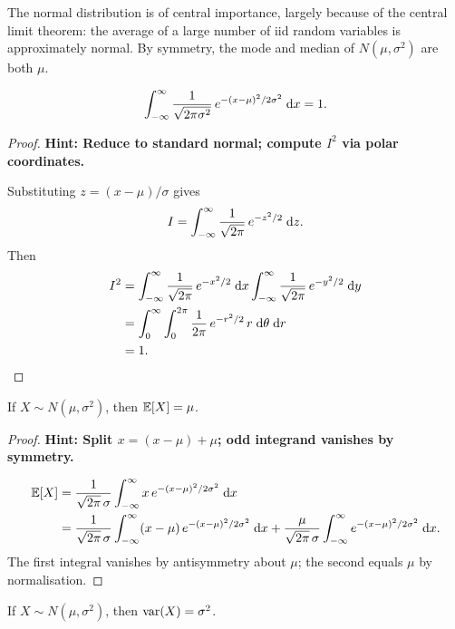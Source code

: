 \documentclass[a4paper]{article}
\begin{document}
\begin{remark}
  The normal distribution is of central importance, largely because of the central limit theorem: the average of a large number of iid random variables is approximately normal.
  By symmetry, the mode and median of $N(\mu, \sigma^2)$ are both $\mu$.
\end{remark}

\begin{prop}
  \[
    \int_{-\infty}^\infty \frac{1}{\sqrt{2\pi\sigma^2}}\, e^{-(x - \mu)^2 / 2\sigma^2}\;\mathrm{d} x = 1.
  \]
\end{prop}

\begin{proof}
  \textbf{Hint: Reduce to standard normal; compute $I^2$ via polar coordinates.}

  Substituting $z = (x - \mu)/\sigma$ gives
  \[
    I = \int_{-\infty}^\infty \frac{1}{\sqrt{2\pi}}\,e^{-z^2/2}\;\mathrm{d} z.
  \]
  Then
  \begin{align*}
    I^2 &= \int_{-\infty}^\infty \frac{1}{\sqrt{2\pi}}\, e^{-x^2/2}\;\mathrm{d} x \int_{-\infty}^\infty \frac{1}{\sqrt{2\pi}}\, e^{-y^2/2}\;\mathrm{d} y\\
    &= \int_0^\infty \int_0^{2\pi} \frac{1}{2\pi}\,e^{-r^2/2}\,r\;\mathrm{d}\theta\;\mathrm{d} r\\
    &= 1.\qedhere
  \end{align*}
\end{proof}

\begin{prop}
  If $X \sim N(\mu, \sigma^2)$, then $\mathbb{E}[X] = \mu$.
\end{prop}

\begin{proof}
  \textbf{Hint: Split $x = (x - \mu) + \mu$; odd integrand vanishes by symmetry.}

  \begin{align*}
    \mathbb{E}[X] &= \frac{1}{\sqrt{2\pi}\,\sigma} \int_{-\infty}^\infty x\, e^{-(x - \mu)^2/2\sigma^2}\;\mathrm{d} x\\
    &= \frac{1}{\sqrt{2\pi}\,\sigma}\int_{-\infty}^\infty (x - \mu)\,e^{-(x - \mu)^2/2\sigma^2}\;\mathrm{d} x + \frac{\mu}{\sqrt{2\pi}\,\sigma}\int_{-\infty}^\infty e^{-(x - \mu)^2/2\sigma^2}\;\mathrm{d} x.
  \end{align*}
  The first integral vanishes by antisymmetry about $\mu$; the second equals $\mu$ by normalisation.
\end{proof}

\begin{prop}
  If $X \sim N(\mu, \sigma^2)$, then $\operatorname{var}(X) = \sigma^2$.
\end{prop}
\end{document}
